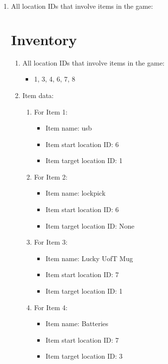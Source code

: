 \documentclass[11pt]{article}
\begin{document}
\begin{enumerate}
\item All location IDs that involve items in the game:

\section*{Inventory}

\begin{enumerate}
    \item All location IDs that involve items in the game:
    \begin{itemize}
        \item 1, 3, 4, 6, 7, 8
    \end{itemize}

    \item Item data:
    \begin{enumerate}
        \item For Item 1:
        \begin{itemize}
            \item Item name: usb
            \item Item start location ID: 6
            \item Item target location ID: 1
        \end{itemize}

        \item For Item 2:
        \begin{itemize}
            \item Item name: lockpick
            \item Item start location ID: 6
            \item Item target location ID: None
        \end{itemize}

        \item For Item 3:
        \begin{itemize}
            \item Item name: Lucky UofT Mug
            \item Item start location ID: 7
            \item Item target location ID: 1
        \end{itemize}

        \item For Item 4:
        \begin{itemize}
            \item Item name: Batteries
            \item Item start location ID: 7
            \item Item target location ID: 3
        \end{itemize}


\end{enumerate}
\end{enumerate}
\end{enumerate}
\end{document}

